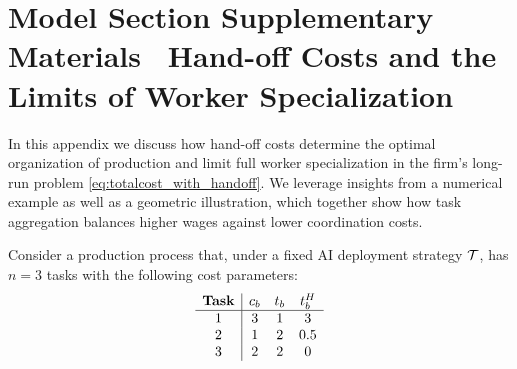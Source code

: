 \section{Model Section Supplementary Materials \textendash \ Hand-off Costs and the Limits of Worker Specialization}
\label{app:model_handoff_discussion}

\renewcommand{\thetable}{B.\arabic{table}}
\renewcommand{\thefigure}{B.\arabic{figure}}
\setcounter{table}{0}
\setcounter{figure}{0}


In this appendix we discuss how hand-off costs determine the optimal organization of production and limit full worker specialization in the firm's long-run problem \eqref{eq:totalcost_with_handoff}.
We leverage insights from a numerical example as well as a geometric illustration, which together show how task aggregation balances higher wages against lower coordination costs.

Consider a production process that, under a fixed AI deployment strategy $\mathcal{T}$, has $n=3$ tasks with the following cost parameters:
\[
\begin{array}{c|ccc}
\textbf{Task} & c_{b} & t_{b} & t^{H}_{b} \\ \hline
1 & 3  & 1   & 3 \\
2 & 1  & 2   & 0.5 \\
3 & 2  & 2   & 0 \\
\end{array}
\]

